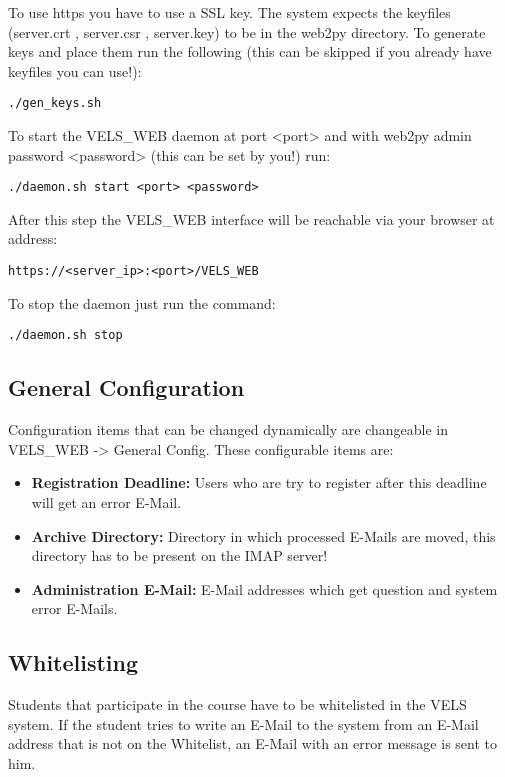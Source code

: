 To use https you have to use a SSL key. The system expects the keyfiles
(server.crt , server.csr , server.key) to be in the web2py directory. To
generate keys and place them run the following (this can be skipped if you
already have keyfiles you can use!):

\begin{verbatim}
./gen_keys.sh
\end{verbatim}

To start the VELS\_WEB daemon at port <port> and with web2py admin password
<password> (this can be set by you!) run:
\begin{verbatim}
./daemon.sh start <port> <password>
\end{verbatim}

After this step the VELS\_WEB interface will be reachable via your browser at
address:
\begin{verbatim}
https://<server_ip>:<port>/VELS_WEB
\end{verbatim}

To stop the daemon just run the command:

\begin{verbatim}
./daemon.sh stop
\end{verbatim}

\subsection{General Configuration}\label{sub:generalconfig}
Configuration items that can be changed dynamically are changeable in VELS\_WEB ->
General Config. These configurable items are:
\begin{itemize}
\item {\bf Registration Deadline:} Users who are try to register after this deadline will
    get an error E-Mail.
\item {\bf Archive Directory:} Directory in which processed E-Mails are moved, this
    directory has to be present on the IMAP server!
\item {\bf Administration E-Mail:} E-Mail addresses which get question and system error E-Mails.

\end{itemize}

\subsection{Whitelisting} \label{sub:whitelisting}
Students that participate in the course have to be whitelisted in the VELS system. If the student
tries to write an E-Mail to the system from an E-Mail address that is not on the Whitelist, an E-Mail
with an error message is sent to him.

